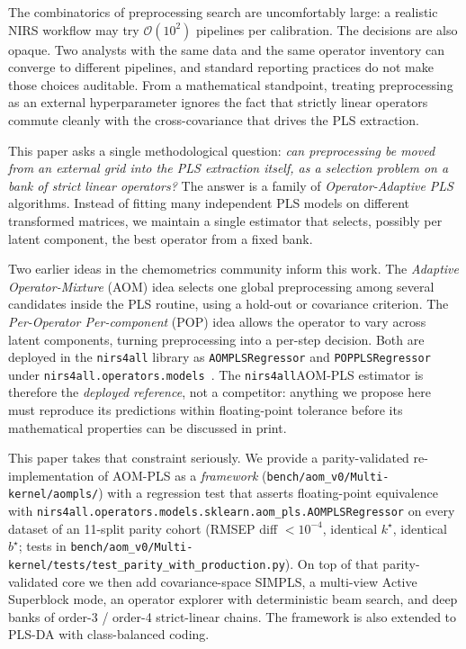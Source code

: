 \documentclass[review,a4paper]{elsarticle}
\newcommand{\AOM}{\textsc{AOM}\xspace}
\newcommand{\POP}{\textsc{POP}\xspace}
\newcommand{\PLS}{\textsc{PLS}\xspace}
\newcommand{\PLSDA}{\textsc{PLS-DA}\xspace}
\newcommand{\SIMPLS}{\textsc{SIMPLS}\xspace}
\newcommand{\nirsfourall}{\texttt{nirs4all}\xspace}
\begin{document}
The combinatorics of preprocessing search are uncomfortably large: a
realistic NIRS workflow may try $\mathcal{O}(10^2)$ pipelines per
calibration. The decisions are also opaque. Two analysts with the same
data and the same operator inventory can converge to different
pipelines, and standard reporting practices do not make those choices
auditable. From a mathematical standpoint, treating preprocessing as an
external hyper\-parameter ignores the fact that strictly linear
operators commute cleanly with the cross-covariance that drives the
\PLS extraction.

This paper asks a single methodological question: \emph{can preprocessing
be moved from an external grid into the \PLS extraction itself, as a
selection problem on a bank of strict linear operators?} The answer is
a family of \emph{Operator-Adaptive \PLS} algorithms. Instead of fitting
many independent \PLS models on different transformed matrices, we
maintain a single estimator that selects, possibly per latent
component, the best operator from a fixed bank.

Two earlier ideas in the chemometrics community inform this work. The
\emph{Adaptive Operator-Mixture} (\AOM) idea selects one global
preprocessing among several candidates inside the \PLS routine, using a
hold-out or covariance criterion. The \emph{Per-Operator Per-component}
(\POP) idea allows the operator to vary across latent components,
turning preprocessing into a per-step decision. Both are deployed in the
\nirsfourall library as \verb|AOMPLSRegressor| and \verb|POPPLSRegressor|
under \verb|nirs4all.operators.models|~\cite{aompls2025prior, nirs4all2025}.
The \nirsfourall \AOM-\PLS estimator is therefore the
\emph{deployed reference}, not a competitor: anything we propose here
must reproduce its predictions within floating-point tolerance before its mathematical
properties can be discussed in print.

This paper takes that constraint seriously. We provide a parity-validated
re-implementation of \AOM-\PLS as a \emph{framework} (\verb|bench/aom_v0/Multi-kernel/aompls/|)
with a regression test that asserts floating-point equivalence with
\verb|nirs4all.operators.models.sklearn.aom_pls.AOMPLSRegressor|
on every dataset of an 11-split parity cohort (RMSEP diff $<10^{-4}$,
identical $k^\star$, identical $b^\star$; tests in
\verb|bench/aom_v0/Multi-kernel/tests/test_parity_with_production.py|). On top of
that parity-validated core we then add covariance-space \SIMPLS, a
multi-view Active Superblock mode, an operator explorer with deterministic
beam search, and deep banks of order-3 / order-4 strict-linear chains.
The framework is also extended to \PLSDA with class-balanced coding.
\end{document}
